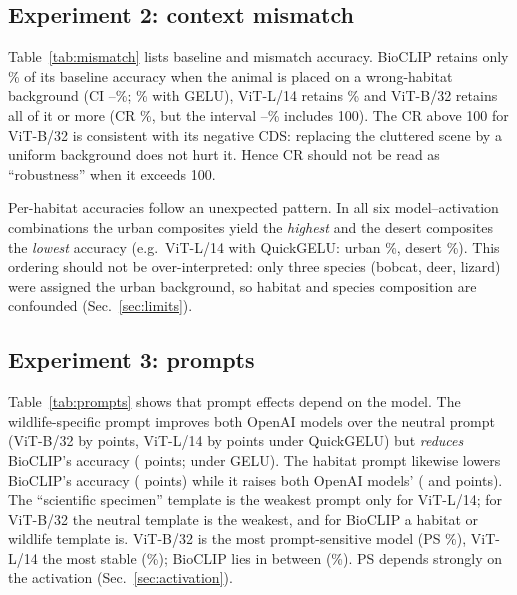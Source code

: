 \documentclass[conference]{IEEEtran}
\begin{document}


\subsection{Experiment 2: context mismatch}
Table~\ref{tab:mismatch} lists baseline and mismatch accuracy. BioCLIP retains only \QBioCR\% of its baseline accuracy when the animal is placed on a wrong-habitat background (CI \QBioCRLo--\QBioCRHi\%; \GBioCR\% with GELU), ViT-L/14 retains \QVLCR\% and ViT-B/32 retains all of it or more (CR \QVBCR\%, but the interval \QVBCRLo--\QVBCRHi\% includes 100). The CR above 100 for ViT-B/32 is consistent with its negative CDS: replacing the cluttered scene by a uniform background does not hurt it. Hence CR should not be read as ``robustness'' when it exceeds 100.



Per-habitat accuracies follow an unexpected pattern. In all six model--activation combinations the urban composites yield the \emph{highest} and the desert composites the \emph{lowest} accuracy (e.g.\ ViT-L/14 with QuickGELU: urban \QVLHabUrban\%, desert \QVLHabDesert\%). This ordering should not be over-interpreted: only three species (bobcat, deer, lizard) were assigned the urban background, so habitat and species composition are confounded (Sec.~\ref{sec:limits}).

\subsection{Experiment 3: prompts}
Table~\ref{tab:prompts} shows that prompt effects depend on the model. The wildlife-specific prompt improves both OpenAI models over the neutral prompt (ViT-B/32 by \QVBPrmWild{} points, ViT-L/14 by \QVLPrmWild{} points under QuickGELU) but \emph{reduces} BioCLIP's accuracy (\QBioPrmWild{} points; \GBioPrmWild{} under GELU). The habitat prompt likewise lowers BioCLIP's accuracy (\QBioPrmHab{} points) while it raises both OpenAI models' (\QVBPrmHab{} and \QVLPrmHab{} points). The ``scientific specimen'' template is the weakest prompt only for ViT-L/14; for ViT-B/32 the neutral template is the weakest, and for BioCLIP a habitat or wildlife template is. ViT-B/32 is the most prompt-sensitive model (PS \QVBPS\%), ViT-L/14 the most stable (\QVLPS\%); BioCLIP lies in between (\QBioPS\%). PS depends strongly on the activation (Sec.~\ref{sec:activation}).


\end{document}
